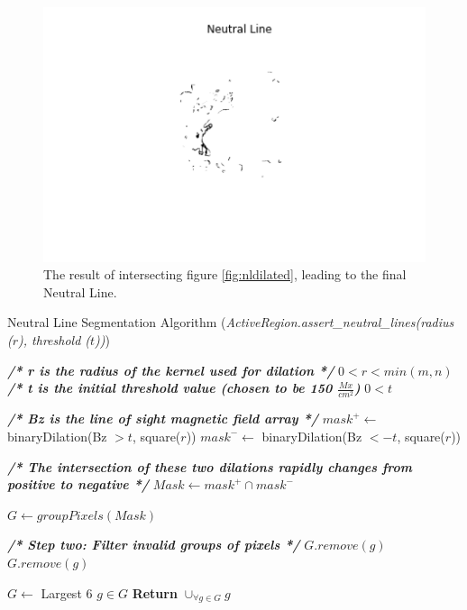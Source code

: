 \begin{figure}[h]
    \centering
    \includegraphics[width=0.7\linewidth]{ThesisFilePkg/figures/data/neutralline.png}
    \caption{The result of intersecting figure \ref{fig:nldilated}, leading to the final Neutral Line.}
    \label{fig:nlfinal}
\end{figure}


\begin{algorithm}
\caption{Neutral Line Segmentation Algorithm (\textit{ActiveRegion.assert\_neutral\_lines(radius ($r$), threshold ($t$))})}\label{alg:nl}
\label{alg:NL}

\begin{algorithmic}[1]

\State
\State \textbf{\textit{/* r is the radius of the kernel used for dilation */}}
\Require $0 < r < min(m,n)$ 
\State
\State \textbf{\textit{/* t is the initial threshold value (chosen to be 150 $\frac{Mx}{cm^2}$)}}
\Require $0 < t$

\State
\State \textbf{\textit{/* Bz is the line of sight magnetic field array */}}
\State $mask^{+} \gets$ binaryDilation(Bz $> t$, square($r$)) 
\State $mask^{-} \gets$ binaryDilation(Bz $< -t$, square($r$)) 

\State
\State \textbf{\textit{/* The intersection of these two dilations rapidly changes from positive to negative */}}
\State $Mask \gets mask^+ \cap mask^-$ 

\State

\State $G \gets groupPixels(Mask)$ 

\State 
\State \textbf{\textit{/* Step two: Filter invalid groups of pixels */}}
        \State $G.remove(g)$
    \EndIf
        \State $G.remove(g)$
    \EndIf
\EndFor

\State
\State $G \gets $ Largest 6 $g \in G$ 
\State
\State \textbf{Return} $\cup_{\forall g \in G}g$ 
\end{algorithmic}
\end{algorithm}

